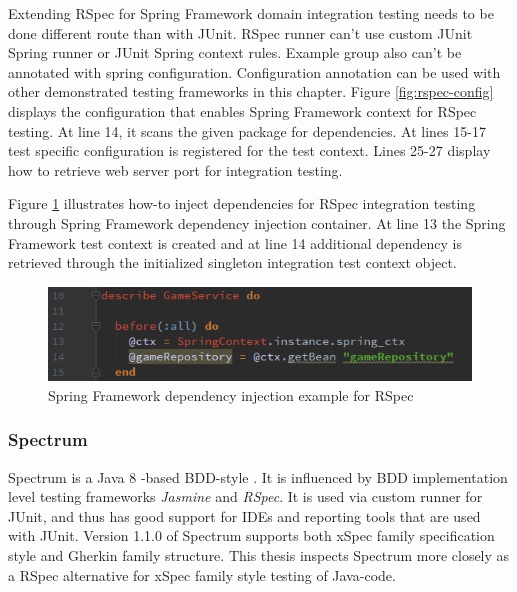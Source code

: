     Extending RSpec for Spring Framework domain integration testing needs to be done different route than with JUnit. RSpec
    runner can't use custom JUnit Spring runner or JUnit Spring context rules. Example group also can't be annotated with
    spring configuration. Configuration annotation can be used with other demonstrated testing frameworks in this chapter. Figure \ref{fig:rspec-config}
    displays the configuration that enables Spring Framework context for RSpec testing. At line 14, it scans the given
    package for dependencies. At lines 15-17 test specific configuration is registered for the test context. Lines 25-27
    display how to retrieve web server port for integration testing.

    Figure \ref{fig:rspec-autowire}
    illustrates how-to inject dependencies for RSpec integration testing through Spring Framework dependency injection container.
    At line 13 the Spring Framework test context is created and at line 14 additional dependency is retrieved
    through the initialized singleton integration test context object.

    \begin{figure}[ht]
      \begin{center}
        \includegraphics[width=12.0cm]{images/rspec-autowire.png}
        \caption{Spring Framework dependency injection example for RSpec}
        \label{fig:rspec-autowire}
      \end{center}
    \end{figure}

    \subsubsection{Spectrum}
    Spectrum is a Java 8 -based BDD-style . It is influenced by BDD implementation
    level testing frameworks \textit{Jasmine} and \textit{RSpec}. It is used via custom runner for JUnit, and thus has good support for
    IDEs and reporting tools that are used with JUnit. Version 1.1.0 of Spectrum supports both xSpec family specification style and Gherkin
    family structure. This thesis inspects Spectrum more closely as a RSpec alternative for xSpec family style testing of Java-code.~\cite{spectrum}

